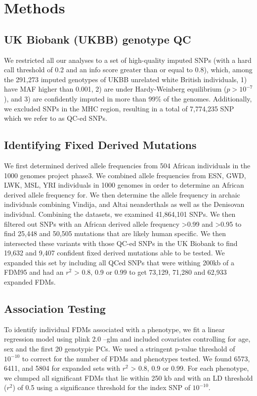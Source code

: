 \section{Methods}
\subsection{UK Biobank (UKBB) genotype QC}
We restricted all our analyses to a set of high-quality imputed SNPs (with a hard call threshold of 0.2 and an info score greater than or equal to 0.8), which, among the 291,273 imputed genotypes of UKBB unrelated white British individuals, 1) have MAF higher than 0.001, 2) are under Hardy-Weinberg equilibrium ($p > 10^{-7}$), and 3) are confidently imputed in more than 99\% of the genomes. Additionally, we excluded SNPs in the MHC region, resulting in a total of 7,774,235 SNP which we refer to as QC-ed SNPs.
\subsection{Identifying Fixed Derived Mutations}
 We first determined derived allele frequencies from 504 African individuals in the 1000 genomes project phase3. We combined allele frequencies from ESN, GWD, LWK, MSL, YRI individuals in 1000 genomes in order to determine an African derived allele frequency for. We then determine the allele frequency in archaic individuals combining Vindija, and Altai neanderthals as well as the Denisovan individual. Combining the datasets, we examined 41,864,101 SNPs. We then filtered out SNPs with an African derived allele frequency >0.99 and >0.95 to find 25,448 and 50,505 mutations that are likely human specific. We then intersected these variants with those QC-ed SNPs in the UK Biobank to find 19,632 and 9,407 confident fixed derived mutations able to be tested. We expanded this set by including all QCed SNPs that were withing 200kb of a FDM95 and had an $r^2$ > 0.8, 0.9 or 0.99 to get 73,129, 71,280 and 62,933 expanded FDMs. 
 
\subsection{Association Testing}
To identify individual FDMs associated with a phenotype, we fit a linear regression model using plink 2.0 --glm and included covariates controlling for age, sex and the first 20 genotypic PCs. We used a stringent p-value threshold of $10^{-10}$ to correct for the number of FDMs and phenotypes tested. We found 6573, 6411, and 5804 for expanded sets with $r^2$ > 0.8, 0.9 or 0.99. For each phenotype, we clumped all significant FDMs that lie within 250 kb and with an LD threshold ($r^2$) of 0.5 using a significance threshold for the index SNP of $10^{-10}$.
